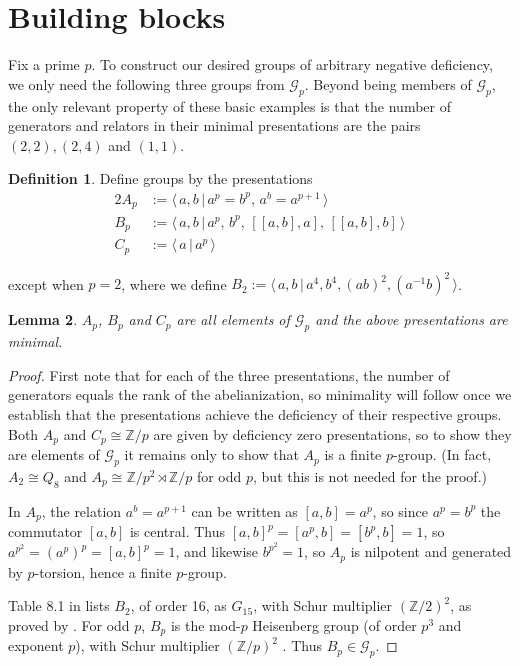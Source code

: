 \documentclass[a4paper,12pt]{amsart}
\theoremstyle{plain}
\newtheorem{lem}{Lemma}
\theoremstyle{definition}
\newtheorem{defn}[lem]{Definition}
\newcommand{\Gp}{\mathcal{G}_p}
\newcommand{\Z}{\mathbb{Z}}
\newcommand{\gp}[2]{\langle \, #1 \, | \, #2 \, \rangle}
\begin{document}
\section{Building blocks}
\label{section:buildingblocks}

Fix a prime $p$. To construct our desired groups of arbitrary negative deficiency, we only need the following three groups from $\Gp$. Beyond being members of $\Gp$, the only relevant property of these basic examples is that the number of generators and relators in their minimal presentations are the pairs $(2,2), (2,4)$ and $(1,1)$.

\begin{defn}
    \label{defn:3ingredients}
    Define groups by the presentations
    \begin{alignat*}{2}
        A_p &:= \gp{a,b}{a^p = b^p, \,a^b = a^{p+1}} \\
        B_p &:= \gp{a,b}{a^p, \,b^p, \,[[a,b], a], \,[[a,b], b]} \\
        C_p &:= \gp{a}{a^p}
    \end{alignat*}

    except when $p = 2$, where we define $B_2 := \gp{a,b}{a^4, b^4, (ab)^2, (a^{-1}b)^2}$.
\end{defn}

\begin{lem}
    $A_p$, $B_p$ and $C_p$ are all elements of $\Gp$ and the above presentations are minimal.
\end{lem}

\begin{proof}

First note that for each of the three presentations, the number of generators equals the rank of the abelianization, so minimality will follow once we establish that the presentations achieve the deficiency of their respective groups.
Both $A_p$ and $C_p \cong \Z/p$ are given by deficiency zero presentations, so to show they are elements of $\Gp$ it remains only to show that $A_p$ is a finite $p$-group.
(In fact, $A_2 \cong Q_8$ and $A_p \cong \Z/p^2 \rtimes \Z/p$ for odd $p$, but this is not needed for the proof.)

In $A_p$, the relation $a^b = a^{p+1}$ can be written as $[a, b] = a^p$, so since $a^p = b^p$ the commutator $[a, b]$ is central.
Thus $[a, b]^p = [a^p, b] = [b^p, b] = 1$, so $a^{p^2} = (a^p)^p = [a, b]^p = 1$, and likewise $b^{p^2} = 1$, so $A_p$ is nilpotent and generated by $p$-torsion, hence a finite $p$-group.

Table 8.1 in \cite{karpilovsky} lists $B_2$, of order 16, as $G_{15}$, with Schur multiplier $(\Z/2)^2$, as proved by \cite{tahara}.
For odd $p$, $B_p$ is the mod-$p$ Heisenberg group (of order $p^3$ and exponent $p$), with Schur multiplier $(\Z/p)^2$ \cite[4.16]{beyltappe}.
Thus $B_p \in \Gp$.

\end{proof}
\end{document}
